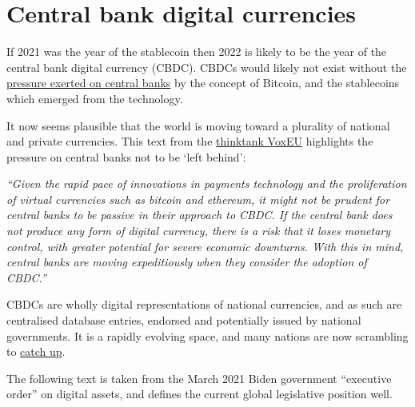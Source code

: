 \section{Central bank digital currencies}
If 2021 was the year of the stablecoin then 2022 is likely to be the year of the central bank digital currency (CBDC). CBDCs would likely not exist without the \href{https://www.theguardian.com/world/2021/jul/09/currency-and-control-why-china-wants-to-undermine-bitcoin}{pressure exerted on central banks} by the concept of Bitcoin, and the stablecoins which emerged from the technology. \par
It now seems plausible that the world is moving toward a plurality of national and private currencies. This text from the \href{https://voxeu.org/article/benefits-central-bank-digital-currency}{thinktank VoxEU} highlights the pressure on central banks not to be `left behind':\par
\textit{``Given the rapid pace of innovations in payments technology and the proliferation of virtual currencies such as bitcoin and ethereum, it might not be prudent for central banks to be passive in their approach to CBDC. If the central bank does not produce any form of digital currency, there is a risk that it loses monetary control, with greater potential for severe economic downturns. With this in mind, central banks are moving expeditiously when they consider the adoption of CBDC.''}\par
CBDCs are wholly digital representations of national currencies, and as such are centralised database entries, endorsed and potentially issued by national governments. It is a rapidly evolving space, and many nations are now scrambling to \href{https://twitter.com/GobiernoMX/status/1476376240873517061}{catch up}.\par
The following text is taken from the March 2021 Biden government ``executive order'' on digital assets, and defines the current global legislative position well.\\
